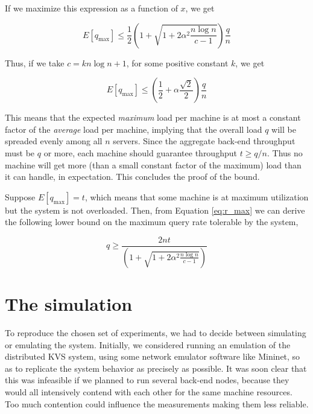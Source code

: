 \documentclass[10pt,letterpaper]{article}
\begin{document}
\noindent
If we maximize this expression as a function of $x$, we get

\begin{equation}
\label{eq:r_max}
E[q_{\max}] \leq \frac{1}{2}\left(1 + \sqrt{1 + 2\alpha^2\frac{n \log n}{c - 1}}\right)\frac{q}{n}
\end{equation}

\noindent
Thus, if we take $c = k n \log n + 1$, for some positive constant $k$, we get

\[
E[q_{\max}] \leq \left(\frac{1}{2} + \alpha\frac{\sqrt{2}}{2}\right) \frac{q}{n}
\]

\noindent
This means that the expected \textit{maximum} load per machine is at most a constant factor of the \textit{average} load per machine, implying that the overall load $q$ will be spreaded evenly among all $n$ servers. Since the aggregate back-end throughput must be $q$ or more, each machine should guarantee throughput $t \geq q / n$. Thus no machine will get more (than a small constant factor of the maximum) load than it can handle, in expectation. This concludes the proof of the bound.

Suppose $E[q_{\max}] = t$, which means that some machine is at maximum utilization but the system is not overloaded. Then, from Equation \ref{eq:r_max} we can derive the following lower bound on the maximum query rate tolerable by the system,

\begin{equation}
\label{eq:max_query_rate}
q \geq \frac{2nt}{\left(1 + \sqrt{1 + 2\alpha^2\frac{n \log n}{c - 1}}\right)}
\end{equation}

\section{The simulation}
\label{sec:simulator}

To reproduce the chosen set of experiments, we had to decide between simulating or emulating the system. Initially, we considered running an emulation of the distributed KVS system, using some network emulator software like Mininet, so as to replicate the system behavior as precisely as possible. It was soon clear that this was infeasible if we planned to run several back-end nodes, because they would all intensively contend with each other for the same machine resources. Too much contention could influence the measurements making them less reliable.
\end{document}
